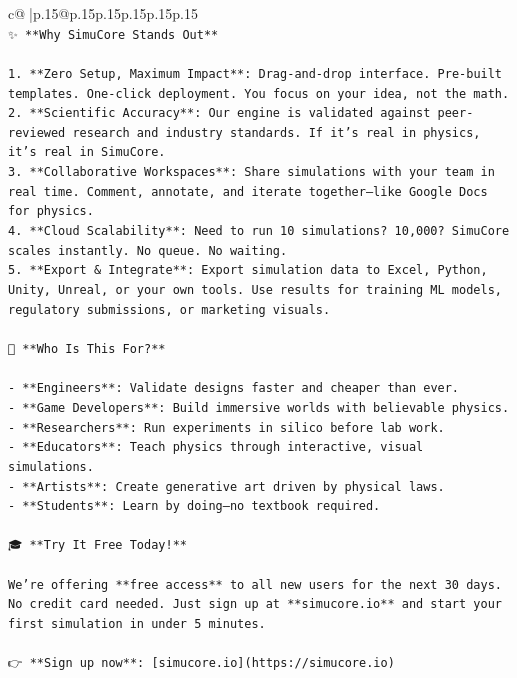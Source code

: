 \documentclass{article}
\begin{document}
{\begin{supertabular}{c@{$\;$}|p{.15\linewidth}@{}p{.15\linewidth}p{.15\linewidth}p{.15\linewidth}p{.15\linewidth}p{.15\linewidth}}
{{{\\ 
\texttt{✨ **Why SimuCore Stands Out**} \\
\\ 
\texttt{1. **Zero Setup, Maximum Impact**: Drag{-}and{-}drop interface. Pre{-}built templates. One{-}click deployment. You focus on your idea, not the math.} \\
\texttt{2. **Scientific Accuracy**: Our engine is validated against peer{-}reviewed research and industry standards. If it’s real in physics, it’s real in SimuCore.} \\
\texttt{3. **Collaborative Workspaces**: Share simulations with your team in real time. Comment, annotate, and iterate together—like Google Docs for physics.} \\
\texttt{4. **Cloud Scalability**: Need to run 10 simulations? 10,000? SimuCore scales instantly. No queue. No waiting.} \\
\texttt{5. **Export \& Integrate**: Export simulation data to Excel, Python, Unity, Unreal, or your own tools. Use results for training ML models, regulatory submissions, or marketing visuals.} \\
\\ 
\texttt{🎯 **Who Is This For?**} \\
\\ 
\texttt{{-} **Engineers**: Validate designs faster and cheaper than ever.} \\
\texttt{{-} **Game Developers**: Build immersive worlds with believable physics.} \\
\texttt{{-} **Researchers**: Run experiments in silico before lab work.} \\
\texttt{{-} **Educators**: Teach physics through interactive, visual simulations.} \\
\texttt{{-} **Artists**: Create generative art driven by physical laws.} \\
\texttt{{-} **Students**: Learn by doing—no textbook required.} \\
\\ 
\texttt{🎓 **Try It Free Today!**} \\
\\ 
\texttt{We’re offering **free access** to all new users for the next 30 days. No credit card needed. Just sign up at **simucore.io** and start your first simulation in under 5 minutes.} \\
\\ 
\texttt{👉 **Sign up now**: {[}simucore.io{]}(https://simucore.io)} \\
}}}
\end{supertabular}}
\end{document}
